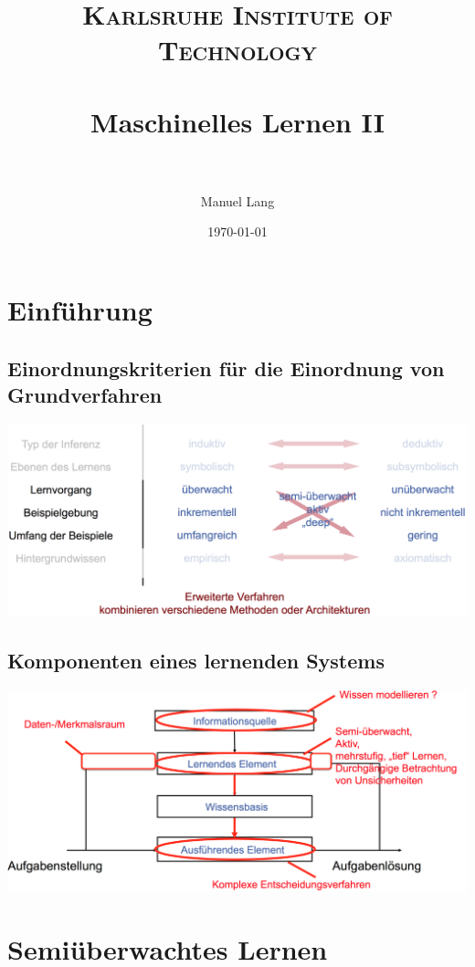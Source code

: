 \documentclass[paper=a4, fontsize=11pt]{scrartcl} %
\title{	
\normalfont \normalsize 
\textsc{Karlsruhe Institute of Technology} \\ [25pt] %
\horrule{0.5pt} \\[0.4cm] %
\huge Maschinelles Lernen II\\ %
\horrule{2pt} \\[0.5cm] %
}
\author{Manuel Lang} %
\date{\normalsize\today} %
\numberwithin{equation}{section} %
\numberwithin{figure}{section} %
\numberwithin{table}{section} %
\begin{document}
\maketitle %
\newpage

{\small\tableofcontents}
\newpage


\section{Einführung}

\subsection{Einordnungskriterien für die Einordnung von Grundverfahren}

\includegraphics[width=\textwidth]{imgs/criteria}

\subsection{Komponenten eines lernenden Systems}

\includegraphics[width=\textwidth]{imgs/components}
\newpage
\section{Semiüberwachtes Lernen}
\end{document}
